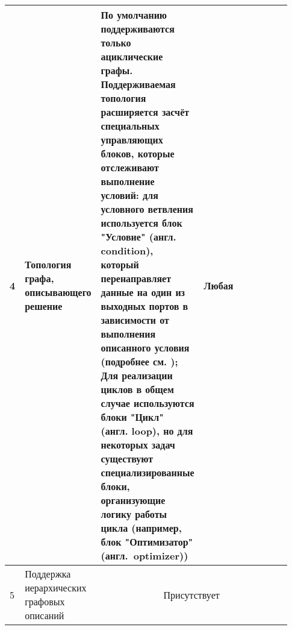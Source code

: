 \begin{landscape}
\begin{longtable}{|p{0.03\linewidth}|p{0.2\linewidth}|p{0.35\linewidth}|p{0.35\linewidth}|}
        \hline
        4          & Топология графа, описывающего решение                                                      & По умолчанию поддерживаются только ациклические графы. Поддерживаемая топология расширяется засчёт специальных управляющих блоков, которые отслеживают выполнение условий: для условного ветвления используется блок "Условие" (англ. condition), который перенаправляет данные на один из выходных портов в зависимости от выполнения описанного условия (подробнее см. \cite{pSevenDocsConditons2022}); Для реализации циклов в общем случае используются блоки "Цикл" (англ. loop)\cite{pSevenDocsWorkflow2021}, но для некоторых задач существуют специализированные блоки, организующие логику работы цикла (например, блок "Оптимизатор" (англ.~optimizer)) & Любая                                                                                                                                                                                                                                                                             \\
        \hline
        5          & Поддержка иерархических графовых описаний                                                  & \multicolumn{2}{c|}{Присутствует}                                                                                                                                                                                                                                                                                                                                                                                                                                                                                                                                                                                                                                                                                                                                                                                                                                                                                                                     \\
        \hline

\end{longtable}
\end{landscape}
